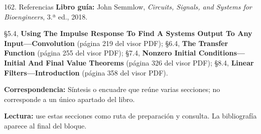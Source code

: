 \documentclass[
  10pt,
  ignorenonframetext,
  aspectratio=169,
  spanish,
]{beamer}
\begin{document}
\begin{frame}{162. Referencias}
\label{referencias-2}
\textbf{Libro guía:} John Semmlow, \emph{Circuits, Signals, and Systems
for Bioengineers}, 3.ª ed., 2018.

§5.4, \textbf{Using The Impulse Response To Find A Systems Output To Any
Input---Convolution} (página 219 del visor PDF); §6.4, \textbf{The
Transfer Function} (página 255 del visor PDF); §7.4, \textbf{Nonzero
Initial Conditions---Initial And Final Value Theorems} (página 326 del
visor PDF); §8.4, \textbf{Linear Filters---Introduction} (página 358 del
visor PDF).

\textbf{Correspondencia:} Síntesis o encuadre que reúne varias
secciones; no corresponde a un único apartado del libro.

\textbf{Lectura:} use estas secciones como ruta de preparación y
consulta. La bibliografía aparece al final del bloque.
\end{frame}
\end{document}

